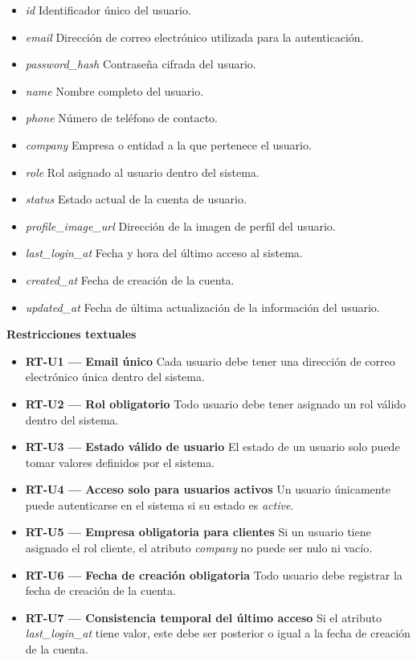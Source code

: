 \begin{itemize}

      \item \textit{id}
            Identificador único del usuario.
      \item \textit{email}
            Dirección de correo electrónico utilizada para la autenticación.
      \item \textit{password\_hash}
            Contraseña cifrada del usuario.
      \item \textit{name}
            Nombre completo del usuario.
      \item \textit{phone}
            Número de teléfono de contacto.
      \item \textit{company}
            Empresa o entidad a la que pertenece el usuario.
      \item \textit{role}
            Rol asignado al usuario dentro del sistema.
      \item \textit{status}
            Estado actual de la cuenta de usuario.
      \item \textit{profile\_image\_url}
            Dirección de la imagen de perfil del usuario.
      \item \textit{last\_login\_at}
            Fecha y hora del último acceso al sistema.
      \item \textit{created\_at}
            Fecha de creación de la cuenta.
      \item \textit{updated\_at}
            Fecha de última actualización de la información del usuario.

\end{itemize}

\textbf{Restricciones textuales}

\begin{itemize}

      \item \textbf{RT-U1 — Email único}
            Cada usuario debe tener una dirección de correo electrónico única dentro del sistema.
      \item \textbf{RT-U2 — Rol obligatorio}
            Todo usuario debe tener asignado un rol válido dentro del sistema.
      \item \textbf{RT-U3 — Estado válido de usuario}
            El estado de un usuario solo puede tomar valores definidos por el sistema.
      \item \textbf{RT-U4 — Acceso solo para usuarios activos}
            Un usuario únicamente puede autenticarse en el sistema si su estado es \textit{active}.
      \item \textbf{RT-U5 — Empresa obligatoria para clientes}
            Si un usuario tiene asignado el rol cliente, el atributo \textit{company} no puede ser nulo ni vacío.
      \item \textbf{RT-U6 — Fecha de creación obligatoria}
            Todo usuario debe registrar la fecha de creación de la cuenta.
      \item \textbf{RT-U7 — Consistencia temporal del último acceso}
            Si el atributo \textit{last\_login\_at} tiene valor, este debe ser posterior o igual a la fecha de creación de la cuenta.

\end{itemize}

